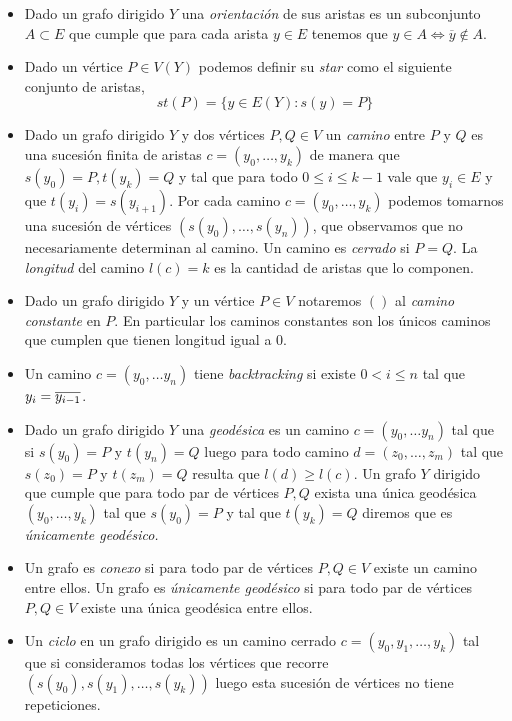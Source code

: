 \documentclass[tesis.tex]{subfiles}
\begin{document}
\begin{deff}
\begin{itemize}
		\item Dado un grafo dirigido $Y$ una \emph{orientación} de sus aristas es un subconjunto $A \subset E$ que cumple que para cada arista $y \in E$ tenemos que $y \in A \iff \overline y \notin A$.	
		
		\item Dado un vértice $P \in V(Y)$ podemos definir su \emph{star} como el siguiente conjunto de aristas,
		\[
		st(P) = \{  y \in E(Y) : s(y) = P  \}
		\]
		
		\item Dado un grafo dirigido $Y$ y dos vértices $P, Q \in V$ un \emph{camino}  entre $P$ y $Q$ es una sucesión finita de aristas $c = (y_0, \dots, y_k)$ de manera que $s(y_0) = P, t(y_k) = Q$ y tal que para todo $0 \le i \le k-1$ vale que $y_i \in E$ y que $t(y_i) = s(y_{i+1})$.
		Por cada camino $c = (y_0, \dots, y_k)$ podemos tomarnos una sucesión de vértices $(s(y_{0}), \dots, s(y_{n}))$, que observamos que no necesariamente determinan al camino.
		Un camino es \emph{cerrado} si $P = Q$.
		La \emph{longitud} del camino $l(c) = k$ es la cantidad de aristas que lo componen.
		
		\item Dado un grafo dirigido $Y$ y un vértice $P \in V$ notaremos $()$ al \emph{camino constante} en $P$. 
		En particular los caminos constantes son los únicos caminos que cumplen que tienen longitud igual a $0$.

		\item Un camino $c= (y_0, \dots y_n)$ tiene \emph{backtracking} si existe $ 0 < i \le n$ tal que $y_i = \overline{y_{i-1}}$.		
		
		\item Dado un grafo dirigido $Y$ una \emph{geodésica} es un camino $c = (y_0, \dots y_n)$ tal que si $s(y_0)=P$ y $t(y_n)=Q$ luego para todo camino $d = (z_0, \dots, z_m)$ tal que $s(z_0) = P$ y $t(z_m) = Q$ resulta que $l(d) \ge l(c)$.
		Un grafo $Y$ dirigido que cumple que para todo par de vértices $P,Q$ exista una única geodésica $(y_0, \dots, y_k)$ tal que $s(y_0) = P$ y tal que $t(y_k) = Q$ diremos que es \emph{únicamente geodésico.}
		
		\item 	Un grafo es \emph{conexo} si para todo par de vértices $P, Q \in V$ existe un camino entre ellos.
		Un grafo es \emph{únicamente geodésico} si para todo par de vértices $P,Q \in V$ existe una única geodésica entre ellos.
		
		
		\item Un \emph{ciclo} en un grafo dirigido es un camino cerrado $c = (y_0, y_1, \dots, y_k)$ tal que si consideramos todas los vértices que recorre $(s(y_0),s(y_{1}), \dots, s(y_{k}))$ luego esta sucesión de vértices no tiene repeticiones.
		

\end{itemize}
\end{deff}
\end{document}
